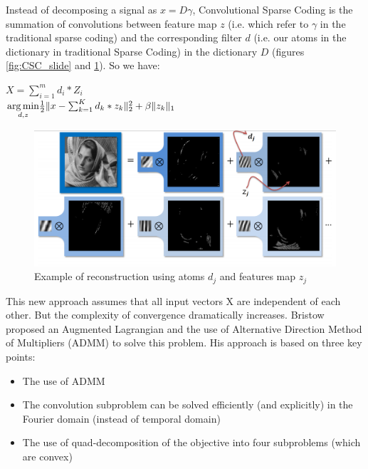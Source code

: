 Instead  of decomposing a signal as $x = D\gamma$, Convolutional Sparse Coding is the summation of convolutions between feature map $z$ (i.e. which refer to $\gamma$ in the traditional sparse coding) and the corresponding filter $d$ (i.e. our atoms in the dictionary in traditional Sparse Coding) in the dictionary $D$ (figures \ref{fig:CSC_slide} and \ref{fig:CSC_test}). So we have:\\
\begin{center}
 $X = \sum_{i=1}^{m} d_i * Z_i$\\  \vspace{0.4cm}
  $\underset{d, z}{\operatorname*{arg\,min}}  \frac{1}{2} \| x - \sum_{k=1}^{K} d_k * z_k \|_2^2 + \beta \|z_k \|_1$\\

\end{center}
\begin{figure}[h]
 \centering
 \includegraphics[scale=1.5]{CSC_test.png}
 \caption{Example of reconstruction using atoms $d_j$ and features map $z_j$\protect\footnotemark}
 \label{fig:CSC_test}
\end{figure}
This new approach assumes that all input vectors X are independent of each other. But the complexity of convergence dramatically increases.
Bristow \cite{6618901} proposed an Augmented Lagrangian and the use of  Alternative Direction Method of Multipliers (ADMM) to solve this problem. His approach is based on three key points:
\begin{itemize}
 \item The use of ADMM
 \item The convolution subproblem can be solved efficiently (and explicitly) in the Fourier domain (instead of temporal domain)
\item The use of quad-decomposition of the objective into four subproblems (which are convex)
\end{itemize}
